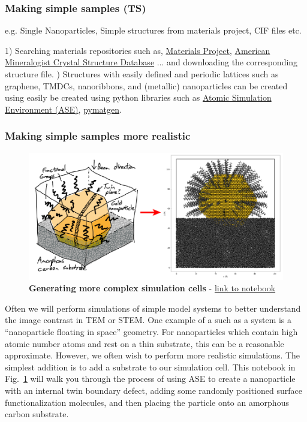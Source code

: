 \documentclass[%
 superscriptaddress,
 aip,
 amsmath,amssymb,
preprint,%
 author-year,%
longbibliography
]{revtex4-2}
\begin{document}
\subsubsection*{Making simple samples (TS)}

e.g. Single Nanoparticles, Simple structures from materials project, CIF files etc. 

1) Searching  materials repositories such as, \href{https://materialsproject.org}{Materials Project}, \href{http://rruff.geo.arizona.edu/AMS/amcsd.php}{American Mineralogist Crystal Structure Database} ... and downloading the corresponding structure file. 
) Structures with easily defined and periodic lattices such as graphene, TMDCs, nanoribbons, and (metallic) nanoparticles can be created using easily be created using python libraries such as \href{https://wiki.fysik.dtu.dk/ase/}{Atomic Simulation Environment (ASE)}, \href{https://pymatgen.org/#}{pymatgen}. 





\subsubsection*{Making simple samples more realistic}

\begin{figure}[htbp]
    \centering
    \includegraphics[width=4.0
    in]{figures/complex_structure.pdf}
    \caption{{\bf Generating more complex simulation cells} - \href{https://github.com/tem-elements/tem-elements/blob/main/notebooks/Sample_NP_functionalized_substrate.ipynb}{link to notebook}}
    \label{Fig:sample_NP_func_substrate}
\end{figure}

Often we will perform simulations of simple model systems to better understand the image contrast in TEM or STEM. One example of a such as a system is a ``nanoparticle floating in space'' geometry. For nanoparticles which contain high atomic number atoms and rest on a thin substrate, this can be a reasonable approximate. However, we often wish to perform more realistic simulations. The simplest addition is to add a substrate to our simulation cell. This notebook in Fig.~\ref{Fig:sample_NP_func_substrate} will walk you through the process of using ASE to create a nanoparticle with an internal twin boundary defect, adding some randomly positioned surface functionalization molecules, and then placing the particle onto an amorphous carbon substrate.
\end{document}
